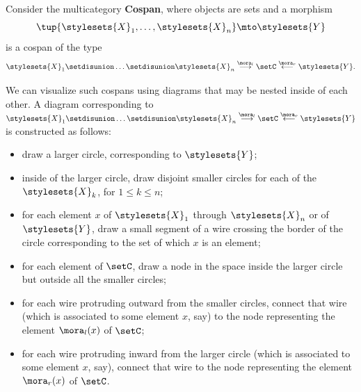{{     %

}

\begin{gradedexercise}
    \label{ex:HwkCospanMulticat}

    Consider the multicategory \textbf{Cospan}, where objects are sets and a morphism
    \begin{equation}
        \tup{\stylesets{X}_1, \dots, \stylesets{X}_n} \mto \stylesets{Y}
    \end{equation}
    is a cospan of the type
    \begin{equation}
        \stylesets{X}_1 \setdisunion \dots \setdisunion \stylesets{X}_n \overset{\mora_l}{\longrightarrow} \setC \overset{\mora_r}{\longleftarrow} \stylesets{Y}.
    \end{equation}

    We can visualize such cospans using diagrams that may be nested inside of each other.
    A diagram corresponding to $\stylesets{X}_1 \setdisunion \dots \setdisunion \stylesets{X}_n \overset{\mora_l}{\longrightarrow} \setC \overset{\mora_r}{\longleftarrow} \stylesets{Y}$ is constructed as follows:
    \begin{itemize}
        \item draw a larger circle, corresponding to $\stylesets{Y}$;
        \item inside of the larger circle, draw disjoint smaller circles for each of the $\stylesets{X}_k$, for $1 \leq k \leq n$;
        \item for each element $x$ of $\stylesets{X}_1$ through $\stylesets{X}_n$ or of $\stylesets{Y}$, draw a small segment of a wire crossing the border of the circle corresponding to the set of which $x$ is an element;
        \item for each element of $\setC$, draw a node in the space inside the larger circle but outside all the smaller circles;
        \item for each wire protruding outward from the smaller circles, connect that wire (which is associated to some element $x$, say) to the node representing the element $\mora_l(x)$ of $\setC$;
        \item for each wire protruding inward from the larger circle (which is associated to some element $x$, say), connect that wire to the node representing the element $\mora_r(x)$ of $\setC$.
    \end{itemize}


\end{gradedexercise}}
